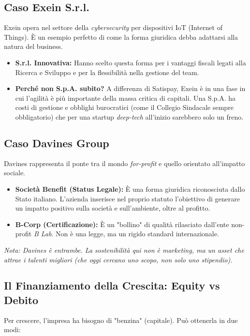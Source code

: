 \documentclass[a4paper,12pt]{article}
\begin{document}
	\subsection{Caso Exein S.r.l.}
	Exein opera nel settore della \textit{cybersecurity} per dispositivi IoT (Internet of Things). È un esempio perfetto di come la forma giuridica debba adattarsi alla natura del business.
	
	\begin{itemize}
		\item \textbf{S.r.l. Innovativa:} Hanno scelto questa forma per i vantaggi fiscali legati alla Ricerca e Sviluppo e per la flessibilità nella gestione del team.
		\item \textbf{Perché non S.p.A. subito?} A differenza di Satispay, Exein è in una fase in cui l'agilità è più importante della massa critica di capitali. Una S.p.A. ha costi di gestione e obblighi burocratici (come il Collegio Sindacale sempre obbligatorio) che per una startup \textit{deep-tech} all'inizio sarebbero solo un freno.
	\end{itemize}
	
	\subsection{Caso Davines Group}
	Davines rappresenta il ponte tra il mondo \textit{for-profit} e quello orientato all'impatto sociale.
	
	\begin{tcolorbox}[colback=purple!5,colframe=purple!75!black,title=Focus: Società Benefit vs B-Corp]
		\begin{itemize}
			\item \textbf{Società Benefit (Status Legale):} È una forma giuridica riconosciuta dallo Stato italiano. L'azienda inserisce nel proprio statuto l'obiettivo di generare un impatto positivo sulla società e sull'ambiente, oltre al profitto.
			\item \textbf{B-Corp (Certificazione):} È un "bollino" di qualità rilasciato dall'ente non-profit \textit{B Lab}. Non è una legge, ma un rigido standard internazionale.
		\end{itemize}
		\textit{Nota: Davines è entrambe. La sostenibilità qui non è marketing, ma un asset che attrae i talenti migliori (che oggi cercano uno scopo, non solo uno stipendio).}
	\end{tcolorbox}
	
	\subsection{Il Finanziamento della Crescita: Equity vs Debito}
	Per crescere, l'impresa ha bisogno di "benzina" (capitale). Può ottenerla in due modi:
	
\end{document}
